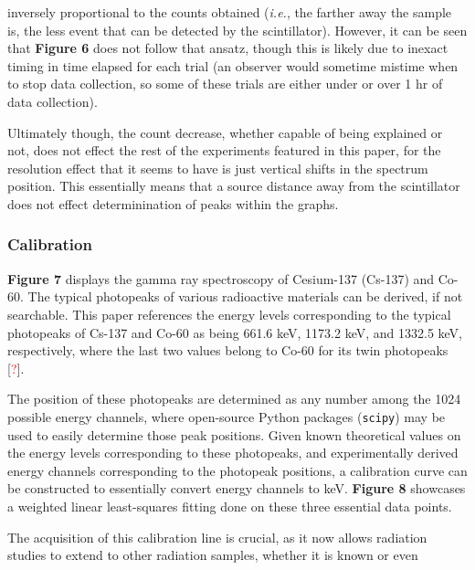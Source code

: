 \documentclass[12pt]{article}
\begin{document}
\begin{multicols}{2}
\noindent
inversely proportional to the counts obtained (\textit{i.e.}, the farther away
the sample is, the less event that can be detected by the scintillator).
However, it can be seen that \textbf{Figure 6} does not follow that ansatz,
though this is likely due to inexact timing in time elapsed for each trial
(an observer would sometime mistime when to stop data collection, so some of
these trials are either under or over 1 hr of data collection).

Ultimately though, the count decrease, whether capable of being explained or not,
does not effect the rest of the experiments featured in this paper,
for the resolution effect that it seems to have is just vertical shifts in the spectrum
position. This essentially means that a source distance away from the scintillator does not effect
determinination of peaks within the graphs.

\subsubsection{Calibration}
\textbf{Figure 7} displays the gamma ray spectroscopy of Cesium-137 (Cs-137) and
Co-60. The typical photopeaks of various radioactive materials can be derived, if not
searchable. This paper references the energy levels corresponding to the typical
photopeaks of Cs-137 and Co-60 as being 661.6 keV, 1173.2 keV, and 1332.5 keV,
respectively, where the last two values belong to Co-60 for its twin photopeaks [\textcolor{red}{?}].

The position of these photopeaks are determined as any number among the 1024 possible
energy channels, where open-source Python packages (\texttt{scipy}) may be used to easily
determine those peak positions. Given known theoretical values on the energy levels
corresponding to these photopeaks, and experimentally derived energy channels corresponding
to the photopeak positions, a calibration curve can be constructed to essentially convert
energy channels to keV. \textbf{Figure 8} showcases a weighted linear least-squares fitting
done on these three essential data points.

The acquisition of this calibration line is crucial, as it now allows radiation
studies to extend to other radiation samples, whether it is known or even
\end{multicols}
\end{document}
